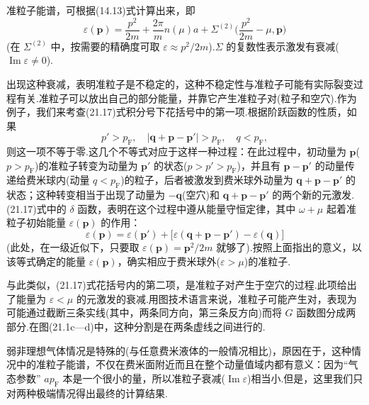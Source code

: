 准粒子能谱，可根据(14.13)式计算出来，即
\begin{equation}
  \varepsilon(\bm{p})=\frac{p^2}{2m}+\frac{2\pi}{m}n(\mu)a+\Sigma^{(2)}\biggl(\frac{p^2}{2m}-\mu,\bm{p}\biggr)
\end{equation}
(在 $\Sigma^{(2)}$ 中，按需要的精确度可取 $\varepsilon\approx p^2/2m$).$\Sigma$ 的复数性表示激发有衰减($\operatorname{Im}\varepsilon\neq0$).

出现这种衰减，表明准粒子是不稳定的，这种不稳定性与准粒子可能有实际裂变过程有关.准粒子可以放出自己的部分能量，并靠它产生准粒子对(粒子和空穴).作为例子，我们来考查(21.17)式积分号下花括号中的第一项.根据阶跃函数的性质，如果
\begin{equation*}
  p'>p_{\mathrm{F}},\quad\bigl|\bm{q}+\bm{p}-\bm{p}'\bigr|>p_{\mathrm{F}},\quad q<p_{\mathrm{F}},
\end{equation*}
则这一项不等于零.这几个不等式对应于这样一种过程：在此过程中，初动量为 $\bm{p}$($p>p_{\mathrm{F}}$)的准粒子转变为动量为 $\bm{p}'$ 的状态($p>p'>p_{\mathrm{F}}$)，并且有 $\bm{p}-\bm{p}'$ 的动量传递给费米球内(动量 $q<p_{\mathrm{F}}$)的粒子，后者被激发到费米球外动量为 $\bm{q}+\bm{p}-\bm{p}'$ 的状态；这种转变相当于出现了动量为 $-\bm{q}$(空穴)和 $\bm{q}+\bm{p}-\bm{p}'$ 的两个新的元激发.(21.17)式中的 $\delta$ 函数，表明在这个过程中遵从能量守恒定律，其中 $\omega+\mu$ 起着准粒子初始能量 $\varepsilon(\bm{p})$ 的作用：
\begin{equation*}
  \varepsilon(\bm{p})=\varepsilon(\bm{p}')+\bigl[\varepsilon(\bm{q}+\bm{p}-\bm{p}')-\varepsilon(\bm{q})\bigr]
\end{equation*}
(此处，在一级近似下，只要取 $\varepsilon(\bm{p})=\bm{p}^2/2m$ 就够了).按照上面指出的意义，以该等式确定的能量 $\varepsilon(\bm p)$，确实相应于费米球外($\varepsilon>\mu$)的准粒子.

与此类似，(21.17)式花括号内的第二项，是准粒子对产生于空穴的过程.此项给出了能量为 $\varepsilon<\mu$ 的元激发的衰减.用图技术语言来说，准粒子可能产生对，表现为可能通过截断三条实线(其中，两条同方向，第三条反方向)而将 $G$ 函数图分成两部分.在图(21.1c—d)中，这种分割是在两条虚线之间进行的.

弱非理想气体情况是特殊的(与任意费米液体的一般情况相比)，原因在于，这种情况中的准粒子能谱，不仅在费米面附近而且在整个动量值域内都有意义：因为“气态参数” $ap_{\mathrm{F}}$ 本是一个很小的量，所以准粒子衰减($\operatorname{Im}\varepsilon$)相当小.但是，这里我们只对两种极端情况得出最终的计算结果.

